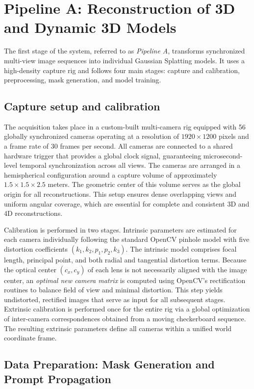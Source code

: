 \section{Pipeline A: Reconstruction of 3D and Dynamic 3D Models}

The first stage of the system, referred to as \emph{Pipeline A}, transforms synchronized multi-view image sequences into individual Gaussian Splatting models. It uses a high-density capture rig and follows four main stages: capture and calibration, preprocessing, mask generation, and model training.

\subsection{Capture setup and calibration}
The acquisition takes place in a custom-built multi-camera rig equipped with 56 globally synchronized cameras operating at a resolution of \(1920 \times 1200\) pixels and a frame rate of 30 frames per second. 
All cameras are connected to a shared hardware trigger that provides a global clock signal, guaranteeing microsecond-level temporal synchronization across all views.
The cameras are arranged in a hemispherical configuration around a capture volume of approximately \(1.5 \times 1.5 \times 2.5\) meters.
The geometric center of this volume serves as the global origin for all reconstructions.
This setup ensures dense overlapping views and uniform angular coverage, which are essential for complete and consistent 3D and 4D reconstructions.

Calibration is performed in two stages. Intrinsic parameters are estimated for each camera individually following the standard OpenCV pinhole model with five distortion coefficients \((k_1, k_2, p_1, p_2, k_3)\). The intrinsic model comprises focal length, principal point, and both radial and tangential distortion terms.
Because the optical center \((c_x, c_y)\) of each lens is not necessarily aligned with the image center, an \emph{optimal new camera matrix} is computed using OpenCV’s rectification routines to balance field of view and minimal distortion. This step yields undistorted, rectified images that serve as input for all subsequent stages.
Extrinsic calibration is performed once for the entire rig via a global optimization of inter-camera correspondences obtained from a moving checkerboard sequence. 
The resulting extrinsic parameters define all cameras within a unified world coordinate frame.  

\subsection{Data Preparation: Mask Generation and Prompt Propagation}
\label{sec:maskgen}


